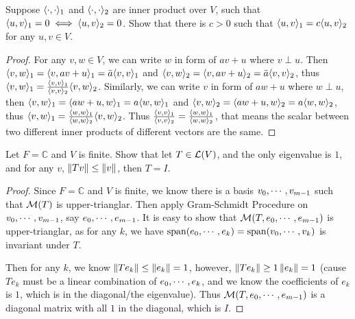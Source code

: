 \documentclass[../main.tex]{subfiles}
\begin{document}
\begin{exercise}
  Suppose $\langle \cdot , \cdot\rangle_1$ and $\langle \cdot , \cdot\rangle_2$ are inner product over $V$,
  such that $\langle u , v\rangle_1 = 0 \iff \langle u , v\rangle_2 = 0$.
  Show that there is $c > 0$ such that $\langle u , v\rangle_1 = c \langle u , v\rangle_2$ for any $u, v \in V$.
\end{exercise}
\begin{proof}
  For any $v, w \in V$, we can write $w$ in form of $av + u$ where $v \perp u$.
  Then $\langle v , w\rangle_1 = \langle v , av + u\rangle_1 = \bar{a}\langle v , v\rangle_1$
  and $\langle v , w\rangle_2 = \langle v , av + u\rangle_2 = \bar{a}\langle v , v\rangle_2$,
  thus $\langle v , w\rangle_1 = \frac{\langle v , v\rangle_1}{\langle v , v\rangle_2}\langle v , w\rangle_2$.
  Similarly, we can write $v$ in form of $aw + u$ where $w \perp u$,
  then $\langle v , w\rangle_1 = \langle aw + u , w\rangle_1 = a\langle w , w\rangle_1$
  and $\langle v , w\rangle_2 = \langle aw + u , w\rangle_2 = a\langle w , w\rangle_2$,
  thus $\langle v , w\rangle_1 = \frac{\langle w , w\rangle_1}{\langle w , w\rangle_2}\langle v , w\rangle_2$.
  Thus $\frac{\langle v , v\rangle_1}{\langle v , v\rangle_2} = \frac{\langle w , w\rangle_1}{\langle w , w\rangle_2}$,
  that means the scalar between two different inner products of different vectors are the same.
\end{proof}

\setcounter{exercise}{16}
\begin{exercise}
  Let $F = \mathbb{C}$ and $V$ is finite. Show that let $T \in \mathcal{L}(V)$,
  and the only eigenvalue is $1$, and for any $v$, $\left\Vert Tv \right\Vert \le \left\Vert v \right\Vert$,
  then $T = I$.
\end{exercise}
\begin{proof}
  Since $F = \mathbb{C}$ and $V$ is finite, we know there is a basis $v_0 , \cdots , v_{m - 1}$
  such that $\mathcal{M}(T)$ is upper-trianglar. Then apply Gram-Schmidt Procedure on $v_0 , \cdots , v_{m - 1}$,
  say $e_0 , \cdots , e_{m - 1}$. It is easy to show that $\mathcal{M}(T, e_0 , \cdots , e_{m - 1})$ is upper-trianglar,
  as for any $k$, we have $\operatorname{span}(e_0 , \cdots , e_{k}) = \operatorname{span}(v_0 , \cdots , v_{k})$ is invariant under $T$.

  Then for any $k$, we know $\left\Vert Te_k \right\Vert \le \left\Vert e_k \right\Vert = 1$,
  however, $\left\Vert Te_k \right\Vert \ge 1 \left\Vert e_k \right\Vert = 1$ 
  (cause $Te_k$ must be a linear combination of $e_0 , \cdots , e_{k}$,
  and we know the coefficients of $e_k$ is $1$, which is in the diagonal/the eigenvalue).
  Thus $\mathcal{M}(T, e_0 , \cdots , e_{m - 1})$ is a diagonal matrix with all $1$ in the diagonal, which is $I$.
\end{proof}
\end{document}
